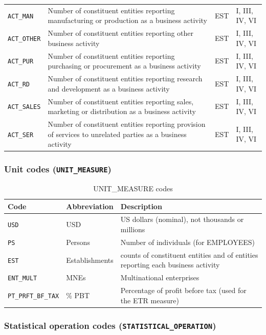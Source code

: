 \documentclass[11pt,a4paper]{article}
\newcommand{\code}[1]{\texttt{#1}}
\begin{document}
\begin{longtable}{@{}lp{6cm}lp{2.5cm}@{}}
\code{ACT\_MAN}  & Number of constituent entities reporting manufacturing or production as a business activity & EST & I, III, IV, VI \\
\code{ACT\_OTHER} & Number of constituent entities reporting other business activity & EST & I, III, IV, VI \\
\code{ACT\_PUR}  & Number of constituent entities reporting purchasing or procurement as a business activity & EST & I, III, IV, VI \\
\code{ACT\_RD}  & Number of constituent entities reporting research and development as a business activity & EST & I, III, IV, VI \\
\code{ACT\_SALES} & Number of constituent entities reporting sales, marketing or distribution as a business activity & EST & I, III, IV, VI \\
\code{ACT\_SER}  & Number of constituent entities reporting provision of services to unrelated parties as a business activity & EST & I, III, IV, VI \\
\end{longtable}

\subsubsection{Unit codes (\texttt{UNIT\_MEASURE})}

\begin{table}[H]
\centering
\caption{UNIT\_MEASURE codes}
\label{tab:units}
\begin{tabular}{@{}llp{8cm}@{}}
\toprule
Code & Abbreviation & Description \\
\midrule
\code{USD} & USD & US dollars (nominal), not thousands or millions \\
\code{PS} & Persons & Number of individuals (for EMPLOYEES) \\
\code{EST} & Establishments & counts of constituent entities and of entities reporting each business activity \\
\code{ENT\_MULT} & MNEs & Multinational enterprises \\
\code{PT\_PRFT\_BF\_TAX} & \% PBT & Percentage of profit before tax (used for the ETR measure) \\
\bottomrule
\end{tabular}
\end{table}

\subsubsection{Statistical operation codes (\texttt{STATISTICAL\_OPERATION})}
\end{document}
